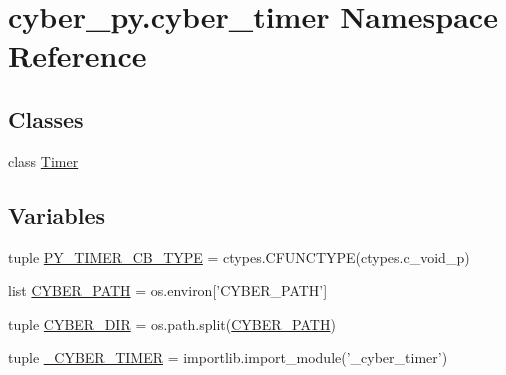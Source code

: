 \hypertarget{namespacecyber__py_1_1cyber__timer}{\section{cyber\-\_\-py.\-cyber\-\_\-timer Namespace Reference}
\label{namespacecyber__py_1_1cyber__timer}
}
\subsection*{Classes}
\begin{DoxyCompactItemize}
\item 
class \hyperlink{classcyber__py_1_1cyber__timer_1_1Timer}{Timer}
\end{DoxyCompactItemize}
\subsection*{Variables}
\begin{DoxyCompactItemize}
\item 
tuple \hyperlink{namespacecyber__py_1_1cyber__timer_a5e39704619198cb3a3073f00ae627903}{P\-Y\-\_\-\-T\-I\-M\-E\-R\-\_\-\-C\-B\-\_\-\-T\-Y\-P\-E} = ctypes.\-C\-F\-U\-N\-C\-T\-Y\-P\-E(ctypes.\-c\-\_\-void\-\_\-p)
\item 
list \hyperlink{namespacecyber__py_1_1cyber__timer_a9124b960c5d5e162ed68a7d1bdc96982}{C\-Y\-B\-E\-R\-\_\-\-P\-A\-T\-H} = os.\-environ\mbox{[}'C\-Y\-B\-E\-R\-\_\-\-P\-A\-T\-H'\mbox{]}
\item 
tuple \hyperlink{namespacecyber__py_1_1cyber__timer_a3430bd073705122f7f88b5db7d369fac}{C\-Y\-B\-E\-R\-\_\-\-D\-I\-R} = os.\-path.\-split(\hyperlink{namespacecyber__py_1_1cyber__timer_a9124b960c5d5e162ed68a7d1bdc96982}{C\-Y\-B\-E\-R\-\_\-\-P\-A\-T\-H})
\item 
tuple \hyperlink{namespacecyber__py_1_1cyber__timer_a8b9d6437312c58af55c4daa4e1474bfe}{\-\_\-\-C\-Y\-B\-E\-R\-\_\-\-T\-I\-M\-E\-R} = importlib.\-import\-\_\-module('\-\_\-cyber\-\_\-timer')
\end{DoxyCompactItemize}


